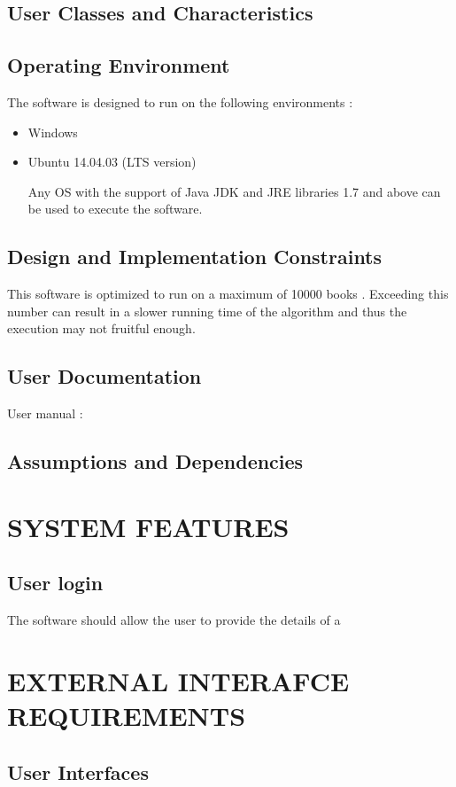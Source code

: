 \documentclass{article}
\begin{document}
\subsection{User Classes and Characteristics}

\subsection{Operating Environment}
The software is designed to run on the following environments :
\begin{itemize}
\item Windows 
\item Ubuntu 14.04.03 (LTS version)

Any OS with the support of Java JDK and JRE libraries 1.7 and above can be used to execute the software.
\end{itemize}

\subsection{Design and Implementation Constraints}
This software is optimized to run on a maximum of 10000 books .
Exceeding this number can result in a slower running time of the algorithm and thus the execution may not fruitful enough.

\subsection{User Documentation}
User manual $:$

\subsection{Assumptions and Dependencies}


\section{SYSTEM FEATURES}
\subsection{User login}
The software should allow the user to provide the details of a 
\section{EXTERNAL INTERAFCE REQUIREMENTS}
\subsection{User Interfaces}
\end{document}
